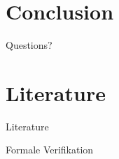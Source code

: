 \documentclass{f4_beamer_metropolis}
\begin{document}
\section{Conclusion}

\begin{frame}

\end{frame}

\begin{frame}[standout]
  Questions?
\end{frame}

\section{Literature}

\begin{frame}[allowframebreaks]{Literature}
  \printbibliography
\end{frame}

\appendix

\begin{frame}{Formale Verifikation}

\end{frame}
\end{document}
